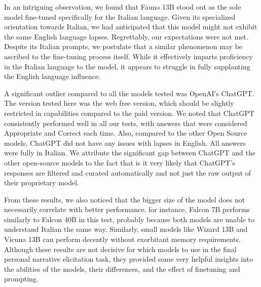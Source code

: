 In an intriguing observation, we found that Fauno 13B \cite{fauno} stood out as the sole model fine-tuned specifically for the Italian language. Given its specialized orientation towards Italian, we had anticipated that this model might not exhibit the same English language lapses. Regrettably, our expectations were not met. Despite its Italian prompts, we postulate that a similar phenomenon may be ascribed to the fine-tuning process itself. While it effectively imparts proficiency in the Italian language to the model, it appears to struggle in fully supplanting the English language influence.

A significant outlier compared to all the models tested was OpenAI's ChatGPT. The version tested here was the web free version, which should be slightly restricted in capabilities compared to the paid version. We noted that ChatGPT consistently performed well in all our tests, with answers that were considered Appropriate and Correct each time. Also, compared to the other Open Source models, ChatGPT did not have any issues with lapses in English. All answers were fully in Italian. We attribute the significant gap between ChatGPT and the other open-source models to the fact that is it very likely that ChatGPT's responses are filtered and curated automatically and not just the raw output of their proprietary model.

From these results, we also noticed that the bigger size of the model does not necessarily correlate with better performance. for instance, Falcon 7B performs similarly to Falcon 40B in this test, probably because both models are unable to understand Italian the same way. Similarly, small models like Wizard 13B and Vicuna 13B can perform decently without exorbitant memory requirements. Although these results are not decisive for which models to use in the final personal narrative elicitation task, they provided some very helpful insights into the abilities of the models, their differences, and the effect of finetuning and prompting.
